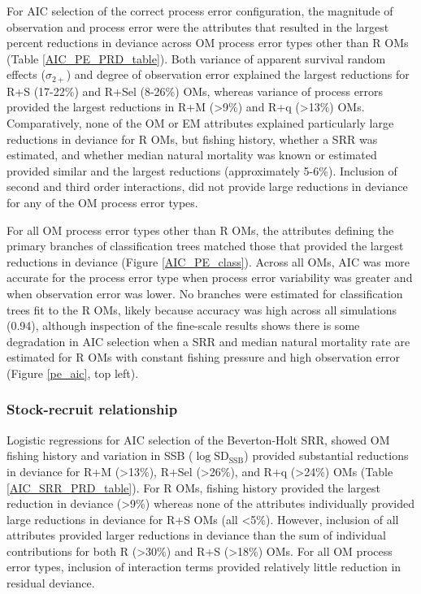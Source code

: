 \documentclass[
  12pt,
]{article}
\begin{document}
For AIC selection of the correct process error configuration, the
magnitude of observation and process error were the attributes that
resulted in the largest percent reductions in deviance across OM process
error types other than R OMs (Table \ref{AIC_PE_PRD_table}). Both
variance of apparent survival random effects (\(\sigma_{2+}\)) and
degree of observation error explained the largest reductions for R+S
(17-22\%) and R+Sel (8-26\%) OMs, whereas variance of process errors
provided the largest reductions in R+M (\textgreater9\%) and R+q
(\textgreater13\%) OMs. Comparatively, none of the OM or EM attributes
explained particularly large reductions in deviance for R OMs, but
fishing history, whether a SRR was estimated, and whether median natural
mortality was known or estimated provided similar and the largest
reductions (approximately 5-6\%). Inclusion of second and third order
interactions, did not provide large reductions in deviance for any of
the OM process error types.

For all OM process error types other than R OMs, the attributes defining
the primary branches of classification trees matched those that provided
the largest reductions in deviance (Figure \ref{AIC_PE_class}). Across
all OMs, AIC was more accurate for the process error type when process
error variability was greater and when observation error was lower. No
branches were estimated for classification trees fit to the R OMs,
likely because accuracy was high across all simulations (0.94), although
inspection of the fine-scale results shows there is some degradation in
AIC selection when a SRR and median natural mortality rate are estimated
for R OMs with constant fishing pressure and high observation error
(Figure \ref{pe_aic}, top left).

\subsubsection*{Stock-recruit
relationship}\label{stock-recruit-relationship}

Logistic regressions for AIC selection of the Beverton-Holt SRR, showed
OM fishing history and variation in SSB
(\(\log \text{SD}_{\text{SSB}}\)) provided substantial reductions in
deviance for R+M (\textgreater13\%), R+Sel (\textgreater26\%), and R+q
(\textgreater24\%) OMs (Table \ref{AIC_SRR_PRD_table}). For R OMs,
fishing history provided the largest reduction in deviance
(\textgreater9\%) whereas none of the attributes individually provided
large reductions in deviance for R+S OMs (all \textless5\%). However,
inclusion of all attributes provided larger reductions in deviance than
the sum of individual contributions for both R (\textgreater30\%) and
R+S (\textgreater18\%) OMs. For all OM process error types, inclusion of
interaction terms provided relatively little reduction in residual
deviance.
\end{document}
